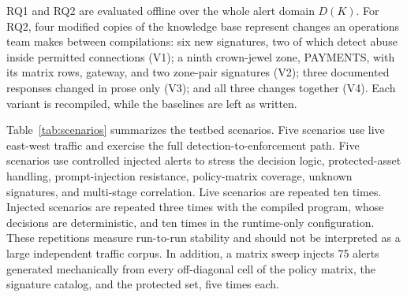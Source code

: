 \documentclass[final,5p]{elsarticle}
\begin{document}
RQ1 and RQ2 are evaluated offline over the whole alert domain $D(K)$. For RQ2, four modified copies of the knowledge base represent changes an operations team makes between compilations: six new signatures, two of which detect abuse inside permitted connections (V1); a ninth crown-jewel zone, PAYMENTS, with its matrix rows, gateway, and two zone-pair signatures (V2); three documented responses changed in prose only (V3); and all three changes together (V4). Each variant is recompiled, while the baselines are left as written.

Table~\ref{tab:scenarios} summarizes the testbed scenarios. Five scenarios use live east-west traffic and exercise the full detection-to-enforcement path. Five scenarios use controlled injected alerts to stress the decision logic, protected-asset handling, prompt-injection resistance, policy-matrix coverage, unknown signatures, and multi-stage correlation. Live scenarios are repeated ten times. Injected scenarios are repeated three times with the compiled program, whose decisions are deterministic, and ten times in the runtime-only configuration. These repetitions measure run-to-run stability and should not be interpreted as a large independent traffic corpus. In addition, a matrix sweep injects 75 alerts generated mechanically from every off-diagonal cell of the policy matrix, the signature catalog, and the protected set, five times each.
\end{document}
